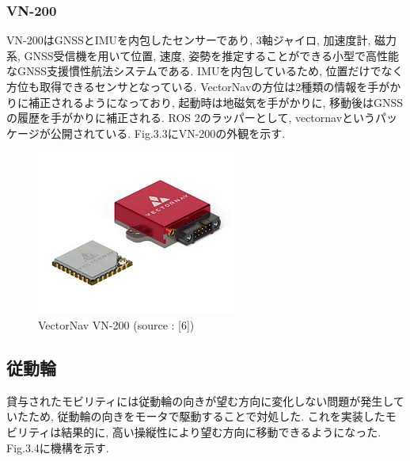 \subsubsection{VN-200}
VN-200\cite{vn-200}はGNSSとIMUを内包したセンサーであり, 3軸ジャイロ, 加速度計, 磁力系, GNSS受信機を用いて位置, 速度, 姿勢を推定することができる小型で高性能なGNSS支援慣性航法システムである.
IMUを内包しているため, 位置だけでなく方位も取得できるセンサとなっている.
VectorNavの方位は2種類の情報を手がかりに補正されるようになっており, 起動時は地磁気を手がかりに, 移動後はGNSSの履歴を手がかりに補正される.
ROS 2のラッパーとして, vectornavというパッケージが公開されている.\cite{vectornav}
Fig.3.3にVN-200の外観を示す.

\begin{figure}[H]
  \centering
 \includegraphics[keepaspectratio, scale=0.6]
      {images/vn-200.png}
 \caption{VectorNav VN-200 (source : [6])}
 \label{fig:vn-200 view}
\end{figure}

\subsection{従動輪}
貸与されたモビリティには従動輪の向きが望む方向に変化しない問題が発生していたため, 従動輪の向きをモータで駆動することで対処した.
これを実装したモビリティは結果的に, 高い操縦性により望む方向に移動できるようになった.
Fig.3.4に機構を示す.


